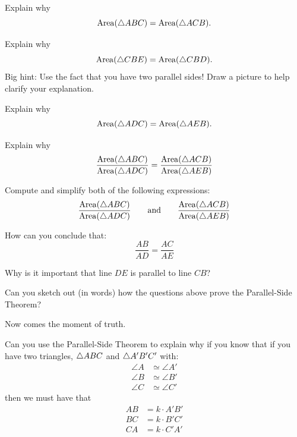 \begin{question} Explain why 
\[
\mathrm{Area}(\triangle ABC) = \mathrm{Area}(\triangle ACB).
\]
\end{question}
\QM

\begin{question} Explain why 
\[
\mathrm{Area}(\triangle CBE) = \mathrm{Area}(\triangle CBD).
\]
Big hint: Use the fact that you have two parallel sides! Draw a
picture to help clarify your explanation.
\end{question}
\QM

\begin{question} Explain why 
\[
\mathrm{Area}(\triangle ADC)= \mathrm{Area}(\triangle AEB).
\]
\end{question}
\QM

\begin{question}
Explain why
\[
\frac{\mathrm{Area}(\triangle ABC)}{\mathrm{Area}(\triangle ADC)} = \frac{ \mathrm{Area}(\triangle ACB)}{\mathrm{Area}(\triangle AEB)}
\]
\end{question}
\QM

\begin{question} Compute and simplify both of the following expressions:
\[
\frac{\mathrm{Area}(\triangle ABC)}{\mathrm{Area}(\triangle ADC)} \qquad\text{and}\qquad\frac{ \mathrm{Area}(\triangle ACB)}{\mathrm{Area}(\triangle AEB)}
\]
\end{question}
\QM


\begin{question} How can you conclude that: 
\[
\frac{AB}{AD} = \frac{AC}{AE}
\]
\end{question}
\QM

\begin{question} 
Why is it important that line $DE$ is parallel to line $CB$?
\end{question}
\QM


\begin{question} 
Can you sketch out (in words) how the questions above prove the Parallel-Side
Theorem?
\end{question}
\QM

Now comes the moment of truth. 
\begin{question}
Can you use the Parallel-Side Theorem to explain why if you know that
if you have two triangles, $\triangle ABC$ and $\triangle A'B'C'$ with:
\begin{align*}
\angle A &\simeq \angle A'\\
\angle B &\simeq \angle B' \\
\angle C &\simeq \angle C'
\end{align*}
then we must have that
\begin{align*}
AB &= k\cdot A'B'\\
BC &= k\cdot B'C'\\
CA &= k\cdot C'A'
\end{align*}
\end{question}
\QM


